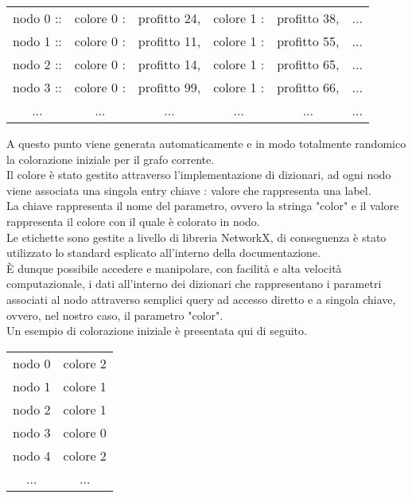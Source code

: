 \begin{table}[H]
\centering
\begin{tabular}{llllll}
\multicolumn{1}{c}{nodo 0 ::} & \multicolumn{1}{c}{colore 0 :} & \multicolumn{1}{c}{profitto 24,} & \multicolumn{1}{c}{colore 1 :} & \multicolumn{1}{c}{profitto 38,} & \multicolumn{1}{c}{...} \\
nodo 1 :: & colore 0 : & profitto 11, & colore 1 : & profitto 55, & ... \\
nodo 2 :: & colore 0 : & profitto 14, & colore 1 : & profitto 65, & ... \\
nodo 3 :: & colore 0 : & profitto 99, & colore 1 : & profitto 66, & ... \\
\multicolumn{1}{c}{...} & \multicolumn{1}{c}{...} & \multicolumn{1}{c}{...} & \multicolumn{1}{c}{...} & \multicolumn{1}{c}{...} & \multicolumn{1}{c}{...}
\end{tabular}
\end{table}

A questo punto viene generata automaticamente e in modo totalmente randomico la colorazione iniziale per il grafo corrente.\\
Il colore è stato gestito attraverso l'implementazione di dizionari, ad ogni nodo viene associata una singola entry chiave : valore che rappresenta una label.\\ La chiave rappresenta il nome del parametro, ovvero la stringa "color" e il valore rappresenta il colore con il quale è colorato in nodo.\\
Le etichette sono gestite a livello di libreria NetworkX, di conseguenza è stato utilizzato lo standard esplicato all'interno della documentazione.\\
È dunque possibile accedere e manipolare, con facilità e alta velocità computazionale, i dati all'interno dei dizionari che rappresentano i parametri associati al nodo attraverso semplici query ad accesso diretto e a singola chiave, ovvero, nel nostro caso, il parametro "color".\\
Un esempio di colorazione iniziale è presentata qui di seguito.

\begin{table}[H]
\centering
\begin{tabular}{cc}
nodo 0 & colore 2 \\
nodo 1 & colore 1 \\
nodo 2 & colore 1 \\
nodo 3 & colore 0 \\
nodo 4 & colore 2 \\
... & ...
\end{tabular}
\end{table}

